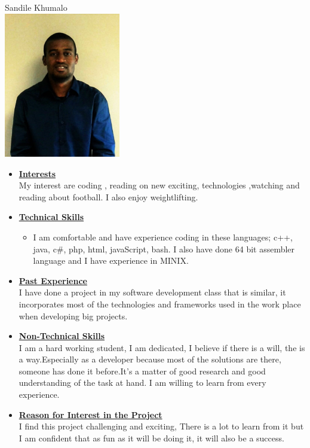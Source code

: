 \documentclass[a4paper,12pt]{article}
\begin{document}
\begin{center}
{\Large Sandile {Khumalo}} \\[0.3cm]
\includegraphics[width=2in]{Sandile.jpg}\\[0.4cm] 
\end{center}



\begin{itemize}
\item {\large \underline{\textbf{Interests}}}\\[0.2cm]
My interest are coding , reading on new exciting, technologies ,watching and reading about football. I also enjoy weightlifting.


\item {\large \underline{\textbf{Technical Skills}}}

	\begin{itemize}
		\item I am comfortable and have experience coding in these languages; c++, java, c\#, php, html, javaScript, bash. I also have done 64 bit assembler language and I have experience in MINIX.
	\end{itemize}
\bigskip
\item {\large \underline{\textbf{Past Experience}}}\\[0.2cm]
I have done a project in my software development class that is similar, it incorporates  most of the technologies and frameworks used in the work place when developing big projects.
\\
\item {\large \underline{\textbf{Non-Technical Skills}}}\\[0.2cm]
 I am a hard working student, I am dedicated, I believe if there is a will, the is a way.Especially as a developer because most of the solutions are there, someone has done it before.It's a matter of good research and good understanding of the task at hand. I am willing to learn from every experience. 
\\
\item {\large \underline{\textbf{Reason for Interest in the Project}}}\\[0.2cm]
I find this project challenging and exciting, There is a lot to learn from it but I am confident that as fun as it will be doing it, it will also be a success.

\end{itemize}
\end{document}
